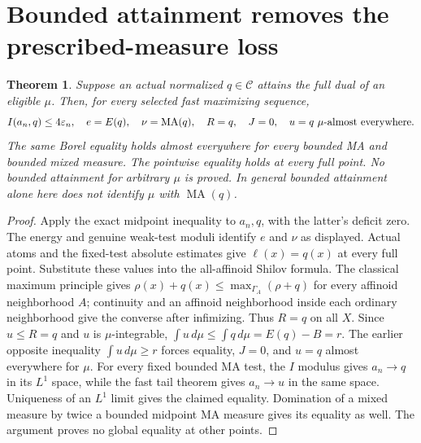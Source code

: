 \documentclass[11pt]{article}
\newtheorem{theorem}{Theorem}
\newcommand{\MA}{\operatorname{MA}}
\newcommand{\C}{\mathcal C}
\begin{document}
\section{Bounded attainment removes the prescribed-measure loss}
\begin{theorem}\label{fresh:attainment}
Suppose an actual normalized $q\in\C$ attains the full dual of an
eligible $\mu$. Then, for every selected fast maximizing sequence,
\[
 I(a_n,q)\le4\varepsilon_n,\quad e=E(q),\quad
 \nu=\MA(q),\quad R=q,\quad J=0,
 \quad u=q\ \mu\hbox{-almost everywhere}.
\]
The same Borel equality holds almost everywhere for every bounded MA
and bounded mixed measure. The pointwise equality holds at every full
point. No bounded attainment for arbitrary $\mu$ is proved. In general
bounded attainment alone here does not identify $\mu$ with $\MA(q)$.
\end{theorem}
\begin{proof}
Apply the exact midpoint inequality to $a_n,q$, with the latter's
deficit zero. The energy and genuine weak-test moduli identify $e$
and $\nu$ as displayed. Actual atoms and the fixed-test absolute
estimates give $\ell(x)=q(x)$ at every full point. Substitute these
values into the all-affinoid Shilov formula. The classical maximum
principle gives $\rho(x)+q(x)\le\max_{\Gamma_A}(\rho+q)$ for every
affinoid neighborhood $A$; continuity and an affinoid neighborhood
inside each ordinary neighborhood give the converse after infimizing.
Thus $R=q$ on all $X$.
Since $u\le R=q$ and $u$ is $\mu$-integrable,
$\int u\,d\mu\le\int q\,d\mu=E(q)-B=r$. The earlier opposite
inequality $\int u\,d\mu\ge r$ forces equality, $J=0$, and
$u=q$ almost everywhere for $\mu$. For every fixed bounded MA test,
the $I$ modulus gives $a_n\to q$ in its $L^1$ space, while the fast
tail theorem gives $a_n\to u$ in the same space. Uniqueness of an
$L^1$ limit gives the claimed equality. Domination of a mixed measure
by twice a bounded midpoint MA measure gives its equality as well.
The argument proves no global equality at other points.
\end{proof}
\end{document}
